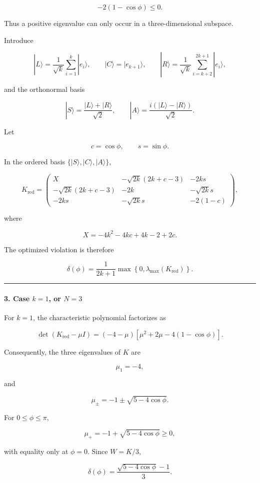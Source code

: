 \[
-2(1-\cos\phi)\leq 0.
\]

Thus a positive eigenvalue can only occur in a three-dimensional subspace.

Introduce

\[
|L\rangle=\frac1{\sqrt k}\sum_{i=1}^k|e_i\rangle, \qquad |C\rangle=|e_{k+1}\rangle, \qquad |R\rangle=\frac1{\sqrt k}\sum_{i=k+2}^{2k+1}|e_i\rangle,
\]

and the orthonormal basis

\[
|S\rangle=\frac{|L\rangle+|R\rangle}{\sqrt2}, \qquad |A\rangle=\frac{i(|L\rangle-|R\rangle)}{\sqrt2}.
\]

Let

\[
c=\cos\phi,\qquad s=\sin\phi.
\]

In the ordered basis $\{|S\rangle,|C\rangle,|A\rangle\}$,

\[
K_{\mathrm{red}}=
\begin{pmatrix}
X &-\sqrt{2k}(2k+c-3)&-2ks\\
-\sqrt{2k}(2k+c-3)&-2k&-\sqrt{2k}s\\
-2ks&-\sqrt{2k}s&-2(1-c)
\end{pmatrix},
\]

where

\[
X=-4k^2-4kc+4k-2+2c.
\]

The optimized violation is therefore

\[
\delta(\phi)=\frac{1}{2k+1} \max\left\{0,\lambda_{\max}(K_{\mathrm{red}})\right\}.
\]

\medskip\hrule\medskip

\paragraph*{3. Case $k=1$, or $N=3$}

For $k=1$, the characteristic polynomial factorizes as

\[
\det(K_{\mathrm{red}}-\mu I) =(-4-\mu) \left[\mu^2+2\mu-4(1-\cos\phi)\right].
\]

Consequently, the three eigenvalues of $K$ are

\[
\mu_1=-4,
\]

and

\[
\mu_{\pm} =-1\pm\sqrt{5-4\cos\phi}.
\]

For $0\leq\phi\leq\pi$,

\[
\mu_+=-1+\sqrt{5-4\cos\phi}\geq0,
\]

with equality only at $\phi=0$. Since $W=K/3$,

\[
{ \delta(\phi) =\frac{\sqrt{5-4\cos\phi}-1}{3} }.
\]

